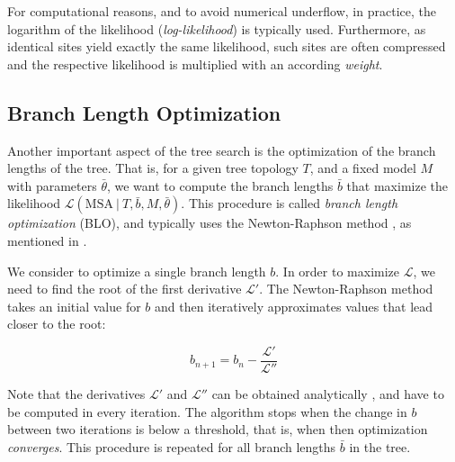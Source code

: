 For computational reasons, and to avoid numerical underflow, in practice,
the logarithm of the likelihood (\emph{log-likelihood}) is typically used.
Furthermore, as identical sites yield exactly the same likelihood,
such sites are often compressed and the respective likelihood is multiplied with an according \emph{weight}.


\subsection{Branch Length Optimization}
\label{ch:Foundations:sec:MLTreeInference:sub:BLO}

Another important aspect of the tree search
is the optimization of the branch lengths of the tree.
That is, for a given tree topology $T$, and a fixed model $M$ with parameters $\bar{\theta}$,
we want to compute the branch lengths $\bar{b}$
that maximize the likelihood $\mathcal{L}( \mbox{MSA} ~|~ T, \bar{b}, M, \bar{\theta} )$.
This procedure is called \emph{branch length optimization} (BLO),
and typically uses the Newton-Raphson method \cite{Ypma1995},
as mentioned in .

We consider to optimize a single branch length $b$.
In order to maximize $\mathcal{L}$, we need to find the root of the first derivative $\mathcal{L}'$.
The Newton-Raphson method takes an initial value for $b$ and then
iteratively approximates values that lead closer to the root:

\begin{equation}
    \label{ch:Foundations:sec:MLTreeInference:eq:BLO}
    b_{n+1} = b_n - \frac{ \mathcal{L}' }{ \mathcal{L}'' }
\end{equation}

Note that the derivatives $\mathcal{L}'$ and $\mathcal{L}''$ can be obtained analytically \cite{Yang2014},
and have to be computed in every iteration.
The algorithm stops when the change in $b$ between two iterations is below a threshold,
that is, when then optimization \emph{converges}.
This procedure is repeated for all branch lengths $\bar{b}$ in the tree.

